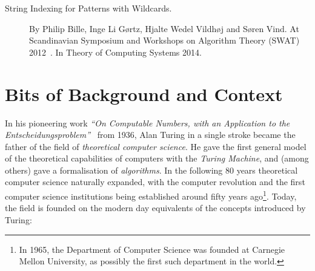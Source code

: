 \begin{description}
    \item[String Indexing for Patterns with Wildcards.] By Philip Bille, Inge Li Gørtz, Hjalte Wedel Vildhøj and Søren Vind. At Scandinavian Symposium and Workshops on Algorithm Theory (SWAT) 2012~\cite{bille2012string}. In Theory of Computing Systems 2014.~\cite{bille2014string}
\end{description}
 

\section{Bits of Background and Context}\label{sec:in-back}

In his pioneering work \emph{``On Computable Numbers, with an Application to the Entscheidungsproblem''}~\cite{turing1936computable} from 1936, Alan Turing in a single stroke became the father of the field of \emph{theoretical computer science}. He gave the first general model of the theoretical capabilities of computers with the \emph{Turing Machine}, and (among others) gave a formalisation of \emph{algorithms}.
In the following 80 years theoretical computer science naturally expanded, with the computer revolution and the first computer science institutions being established around fifty years ago\footnote{In 1965, the Department of Computer Science was founded at Carnegie Mellon University, as possibly the first such department in the world.}. 
Today, the field is founded on the modern day equivalents of the concepts introduced by Turing:

